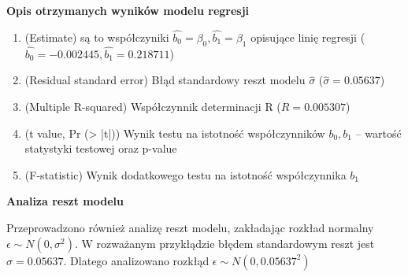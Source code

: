 \documentclass[a4paper,11pt]{article}
\begin{document}
\textbf{Opis otrzymanych wyników modelu regresji}
\begin{enumerate}
  \item (Estimate) są to współczyniki $\hat{b_{0}}=\beta_{0}, \hat{b_{1}}=\beta_{1}$ opisujące linię regresji ($\hat{b_{0}}=-0.002445, \hat{b_{1}}=0.218711$)
  \item  (Residual standard error) Błąd standardowy reszt modelu $\hat{\sigma}$ ($\hat{\sigma} = 0.05637$)
  \item (Multiple R-squared) Współczynnik determinacji R ($R=0.005307$)
  \item (t value, Pr (> |t|)) Wynik testu na istotność współczynników $b_{0}, b_{1}$ – wartość statystyki testowej oraz p-value
  \item (F-statistic) Wynik dodatkowego testu na istotność współczynnika $b_1$

\end{enumerate}

\textbf{Analiza reszt modelu}

Przeprowadzono również analizę reszt modelu, zakładając rozkład normalny $\epsilon \sim N(0, \sigma^2)$. W rozważanym przykłądzie błędem standardowym reszt jest $\hat{\sigma} = 0.05637$. Dlatego analizowano rozkłąd $\epsilon \sim N(0, 0.05637^2)$
\end{document}

